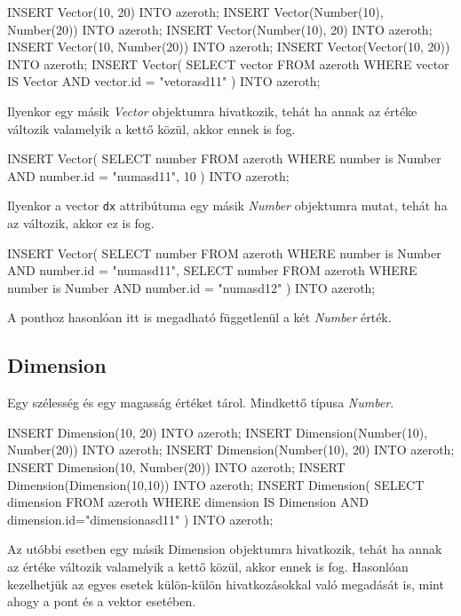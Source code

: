 \begin{sql}
INSERT Vector(10, 20) INTO azeroth;
INSERT Vector(Number(10), Number(20)) INTO azeroth;
INSERT Vector(Number(10), 20) INTO azeroth;
INSERT Vector(10, Number(20)) INTO azeroth;
INSERT Vector(Vector(10, 20)) INTO azeroth;
INSERT Vector(
    SELECT vector FROM azeroth
    WHERE vector IS Vector AND vector.id = "vetorasd11"
) INTO azeroth;
\end{sql}

Ilyenkor egy másik \textit{Vector} objektumra hivatkozik, tehát ha annak az értéke változik valamelyik a kettő közül, akkor ennek is fog.

\begin{sql}
INSERT Vector(
    SELECT number FROM azeroth
    WHERE number is Number AND number.id = "numasd11", 10
) INTO azeroth;
\end{sql}

Ilyenkor a vector \texttt{dx} attribútuma egy másik \textit{Number} objektumra mutat, tehát ha az változik, akkor ez is fog.

\begin{sql}
INSERT Vector(
    SELECT number FROM azeroth
    WHERE number is Number AND number.id = "numasd11",
    SELECT number FROM azeroth
    WHERE number is Number AND number.id = "numasd12"
) INTO azeroth;
\end{sql}

A ponthoz hasonlóan itt is megadható függetlenül a két \textit{Number} érték.

\subsection{Dimension}

Egy szélesség és egy magasság értéket tárol. Mindkettő típusa \textit{Number}.

\begin{sql}
INSERT Dimension(10, 20) INTO azeroth;
INSERT Dimension(Number(10), Number(20)) INTO azeroth;
INSERT Dimension(Number(10), 20) INTO azeroth;
INSERT Dimension(10, Number(20)) INTO azeroth;
INSERT Dimension(Dimension(10,10)) INTO azeroth;
INSERT Dimension(
    SELECT dimension FROM azeroth
    WHERE dimension IS Dimension AND dimension.id="dimensionasd11"
) INTO azeroth;
\end{sql}

Az utóbbi esetben egy másik Dimension objektumra hivatkozik, tehát ha annak az értéke változik valamelyik a kettő közül, akkor ennek is fog. Hasonlóan kezelhetjük az egyes esetek külön-külön hivatkozásokkal való megadását is, mint ahogy a pont és a vektor esetében.

